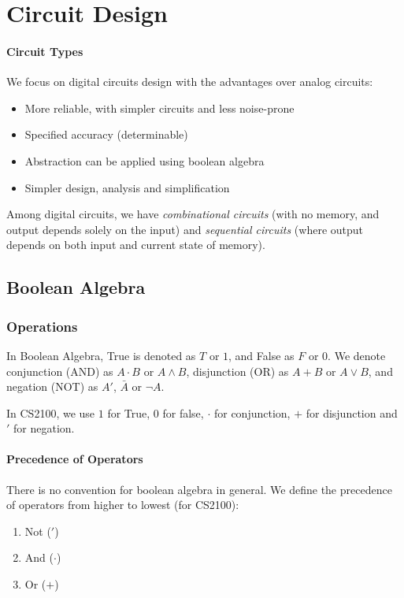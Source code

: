 \section{Circuit Design}
\paragraph{Circuit Types}
We focus on digital circuits design with the advantages over analog circuits:
\begin{itemize}
  \item More reliable, with simpler circuits and less noise-prone
  \item Specified accuracy (determinable)
  \item Abstraction can be applied using boolean algebra
  \item Simpler design, analysis and simplification
\end{itemize}
Among digital circuits, we have \textit{combinational circuits} (with no
memory, and output depends solely on the input) and \textit{sequential
circuits} (where output depends on both input and current state of memory).

\subsection{Boolean Algebra}
\subsubsection{Operations}
\begin{notation}
  In Boolean Algebra, True is denoted as $T$ or $1$, and False as $F$ or $0$.
  We denote conjunction (AND) as $A\cdot B$ or $A\wedge B$, disjunction (OR) as
  $A+B$ or $A\vee B$, and negation (NOT) as $A'$, $\bar{A}$ or $\neg{A}$. 
  \begin{remark}
    In CS2100, we use $1$ for True, $0$ for false, $\cdot$ for conjunction, $+$
    for disjunction and $'$ for negation.
  \end{remark}
\end{notation}
\paragraph{Precedence of Operators}
There is no convention for boolean algebra in general. We define the precedence
of operators from higher to lowest (for CS2100):
\begin{enumerate}
  \item Not ($'$)
  \item And ($\cdot$)
  \item Or ($+$)
\end{enumerate}
